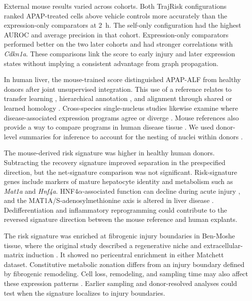External mouse results varied across cohorts. Both TrajRisk configurations ranked APAP-treated cells above vehicle controls more accurately than the expression-only comparators at 2~h. The self-only configuration had the highest AUROC and average precision in that cohort. Expression-only comparators performed better on the two later cohorts and had stronger correlations with \textit{Cdkn1a}. These comparisons link the score to early injury and later expression states without implying a consistent advantage from graph propagation.

In human liver, the mouse-trained score distinguished APAP-ALF from healthy donors after joint unsupervised integration. This use of a reference relates to transfer learning \cite{ref064}, hierarchical annotation \cite{ref065}, and alignment through shared or learned homology \cite{ref066,ref067}. Cross-species single-nucleus studies likewise examine where disease-associated expression programs agree or diverge \cite{ref068,ref069}. Mouse references also provide a way to compare programs in human disease tissue \cite{ref067}. We used donor-level summaries for inference to account for the nesting of nuclei within donors \cite{ref070,ref071,ref072}.

The mouse-derived risk signature was higher in healthy human donors. Subtracting the recovery signature improved separation in the prespecified direction, but the net-signature comparison was not significant. Risk-signature genes include markers of mature hepatocyte identity and metabolism such as \textit{Mat1a} and \textit{Hnf4a}. HNF4\ensuremath{\alpha}-associated function can decline during acute injury \cite{ref073}, and the MAT1A/S-adenosylmethionine axis is altered in liver disease \cite{ref074}. Dedifferentiation \cite{ref073,ref075} and inflammatory reprogramming \cite{ref073,ref076} could contribute to the reversed signature direction between the mouse reference and human explants.

The risk signature was enriched at fibrogenic injury boundaries in Ben-Moshe tissue, where the original study described a regenerative niche and extracellular-matrix induction \cite{ref011}. It showed no pericentral enrichment in either Matchett dataset. Constitutive metabolic zonation \cite{ref077,ref078,ref079} differs from an injury boundary defined by fibrogenic remodeling. Cell loss, remodeling, and sampling time may also affect these expression patterns \cite{ref011,ref080,ref081}. Earlier sampling and donor-resolved analyses could test when the signature localizes to injury boundaries.

